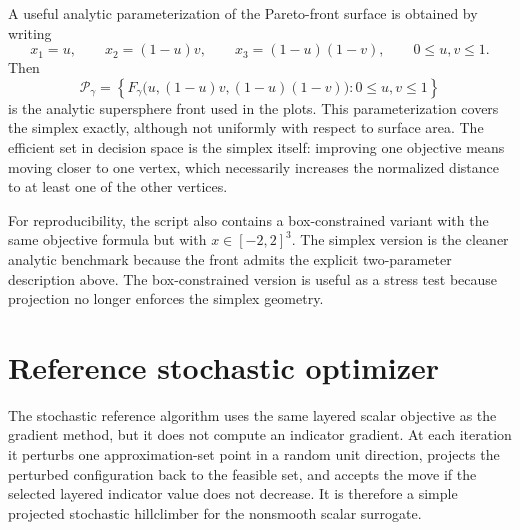 \documentclass{article}
\begin{document}
A useful analytic parameterization of the Pareto-front surface is obtained by writing
\[
x_1=u,
\qquad
x_2=(1-u)v,
\qquad
x_3=(1-u)(1-v),
\qquad 0\le u,v\le 1.
\]
Then
\[
\mathcal{P}_\gamma
=
\left\{F_\gamma\bigl(u,(1-u)v,(1-u)(1-v)\bigr):0\le u,v\le 1\right\}
\]
is the analytic supersphere front used in the plots.  This parameterization covers the simplex exactly, although not uniformly with respect to surface area.  The efficient set in decision space is the simplex itself: improving one objective means moving closer to one vertex, which necessarily increases the normalized distance to at least one of the other vertices.



For reproducibility, the script also contains a box-constrained variant with the same objective formula but with $x\in[-2,2]^3$.  The simplex version is the cleaner analytic benchmark because the front admits the explicit two-parameter description above.  The box-constrained version is useful as a stress test because projection no longer enforces the simplex geometry.

\section{Reference stochastic optimizer}
\label{app:stochastic-optimizer}

The stochastic reference algorithm uses the same layered scalar objective as the gradient method, but it does not compute an indicator gradient.  At each iteration it perturbs one approximation-set point in a random unit direction, projects the perturbed configuration back to the feasible set, and accepts the move if the selected layered indicator value does not decrease.  It is therefore a simple projected stochastic hillclimber for the nonsmooth scalar surrogate.
\end{document}
